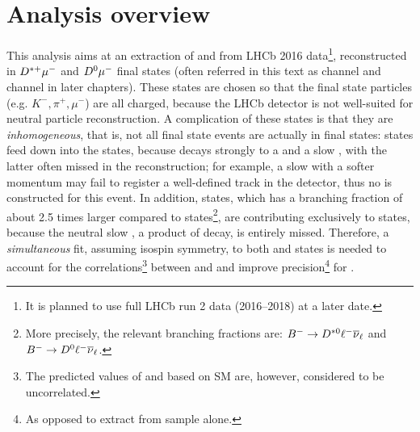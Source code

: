 \chapter{Analysis overview}
\label{ref:overview}

This analysis aims at an extraction of \RD and \RDst from
LHCb 2016 data\footnote{
    It is planned to use full LHCb run 2 data (2016--2018) at a later date.
}, reconstructed in ${{D}^{*+}}{\mu^-}$ and ${{D}^0}{\mu^-}$ final states
(often referred in this text as \Dstar channel and \Dz channel in later
chapters).
These states are chosen so that the final state particles
(e.g. $K^-, \pi^+, \mu^-$) are all charged, because the LHCb detector is not
well-suited for neutral particle reconstruction.
A complication of these states is that they are \emph{inhomogeneous},
that is, not all \Dz\mun final state events are actually in \Dz\mun final
states:
\Dstarp\mun states feed down into the \Dz\mun states,
because \Dstarp decays strongly to a \Dz and a slow \pip,
with the latter often missed in the reconstruction;
for example, a slow \pip with a softer momentum may fail to register a
well-defined track in the detector, thus no \Dstarp is constructed for this
event.
In addition, \Dstarz\mun states,
which has a branching fraction of about 2.5 times larger compared to \Dz\mun
states\footnote{
    More precisely, the relevant branching fractions are:
    ${{{B}^-}} \rightarrow {\ensuremath{{D}^{*0}}} \ell^- {{\overline{\nu}}_\ell}$ and
    ${{{B}^-}} \rightarrow {\ensuremath{{D}^0}} \ell^- {{\overline{\nu}}_\ell}$.
},
are contributing exclusively to \Dz\mun states, because the neutral slow
\piz, a product of \Dstarz decay, is entirely missed.
Therefore, a \emph{simultaneous} fit,
assuming isospin symmetry,
to both \Dstarp\mun and \Dz\mun states is needed to
account for the correlations\footnote{
    The predicted values of \RD and \RDst based on SM are, however, considered
    to be uncorrelated.
} between \RD and \RDst and improve precision\footnote{
    As opposed to extract \RDst from \Dstarp\mun sample alone.
} for \RDst.

